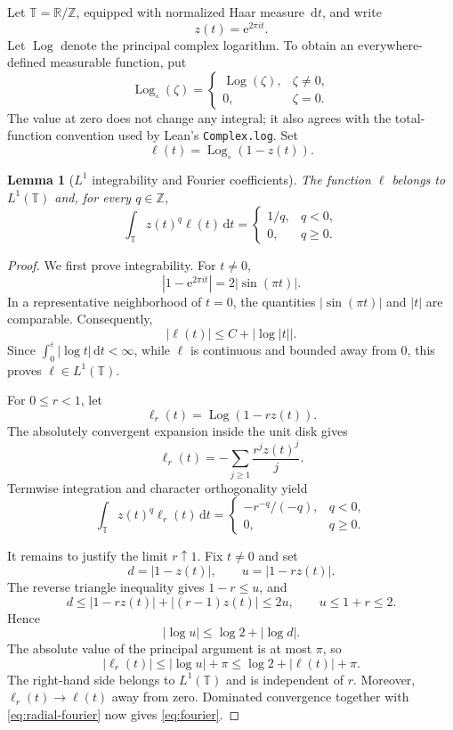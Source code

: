 \documentclass[11pt,a4paper]{article}
\newtheorem{lemma}[theorem]{Lemma}
\theoremstyle{definition}
\newcommand{\e}{\mathrm e}
\newcommand{\T}{\mathbb T}
\newcommand{\Z}{\mathbb Z}
\newcommand{\dd}{\,\mathrm d}
\newcommand{\Logc}{\operatorname{Log}_{\circ}}
\begin{document}
Let $\T=\mathbb R/\mathbb Z$, equipped with normalized Haar measure
$\dd t$, and write
\[
  z(t)=\e^{2\pi i t}.
\]
Let $\operatorname{Log}$ denote the principal complex logarithm. To obtain
an everywhere-defined measurable function, put
\[
\Logc(\zeta)=
\begin{cases}
\operatorname{Log}(\zeta),&\zeta\ne0,\\
0,&\zeta=0.
\end{cases}
\]
The value at zero does not change any integral; it also agrees with the
total-function convention used by Lean's \texttt{Complex.log}. Set
\[
  \ell(t)=\Logc(1-z(t)).
\]

\begin{lemma}[$L^1$ integrability and Fourier coefficients]
\label{lem:fourier}
The function $\ell$ belongs to $L^1(\T)$ and, for every $q\in\Z$,
\begin{equation}\label{eq:fourier}
\int_\T z(t)^q\ell(t)\dd t=
\begin{cases}
1/q,&q<0,\\
0,&q\ge0.
\end{cases}
\end{equation}
\end{lemma}

\begin{proof}
We first prove integrability. For $t\ne0$,
\[
 |1-\e^{2\pi it}|=2|\sin(\pi t)|.
\]
In a representative neighborhood of $t=0$, the quantities
$|\sin(\pi t)|$ and $|t|$ are comparable. Consequently,
\[
 |\ell(t)|\le C+|\log|t||.
\]
Since $\int_0^\varepsilon|\log t|\dd t<\infty$, while $\ell$ is
continuous and bounded away from $0$, this proves $\ell\in L^1(\T)$.

For $0\le r<1$, let
\[
  \ell_r(t)=\operatorname{Log}(1-rz(t)).
\]
The absolutely convergent expansion inside the unit disk gives
\[
  \ell_r(t)=-\sum_{j\ge1}\frac{r^jz(t)^j}{j}.
\]
Termwise integration and character orthogonality yield
\begin{equation}\label{eq:radial-fourier}
\int_\T z(t)^q\ell_r(t)\dd t=
\begin{cases}
-r^{-q}/(-q),&q<0,\\
0,&q\ge0.
\end{cases}
\end{equation}

It remains to justify the limit $r\uparrow1$. Fix $t\ne0$ and set
\[
 d=|1-z(t)|,\qquad u=|1-rz(t)|.
\]
The reverse triangle inequality gives $1-r\le u$, and
\[
 d\le |1-rz(t)|+|(r-1)z(t)|\le2u,
\qquad u\le1+r\le2.
\]
Hence
\[
 |\log u|\le\log2+|\log d|.
\]
The absolute value of the principal argument is at most $\pi$, so
\begin{equation}\label{eq:domination}
|\ell_r(t)|
\le |\log u|+\pi
\le \log2+|\ell(t)|+\pi.
\end{equation}
The right-hand side belongs to $L^1(\T)$ and is independent of $r$.
Moreover, $\ell_r(t)\to\ell(t)$ away from zero. Dominated convergence
together with \eqref{eq:radial-fourier} now gives \eqref{eq:fourier}.
\end{proof}
\end{document}
